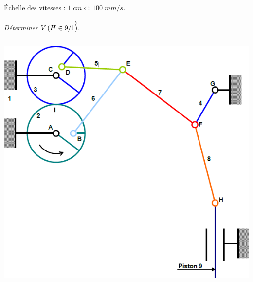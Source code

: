 \documentclass[11pt,oneside]{article}
\begin{document}
Échelle des vitesses : $1\; cm \Longleftrightarrow 100\; mm/s$.
\paragraph{}
\textit{Déterminer  $\overrightarrow{V\left( {H} \in {9}/{1}\right)}$.}

\newpage
$$
\quad
$$

\vspace{2cm}

\begin{center}
\includegraphics[width=.7\textwidth]{png/fig2}
\end{center}
\end{document}
